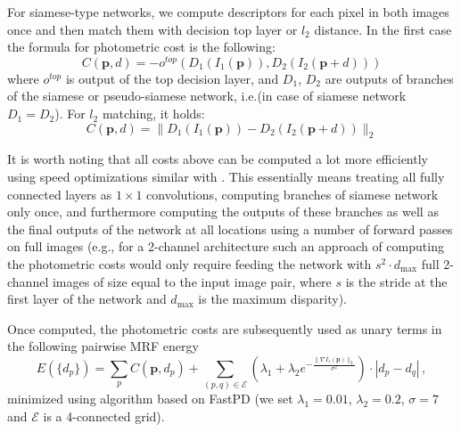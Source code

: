 \documentclass[10pt,twocolumn,letterpaper]{article}
\begin{document}
For siamese-type networks, %
we compute descriptors for each pixel
in both images once and then match them with decision top layer or $l_2$ distance. In the first case
the formula for photometric cost is the following:
\begin{equation}
  C(\mathbf{p},d) = - o^{top}(D_1(I_1(\mathbf{p})), D_2(I_2(\mathbf{p} + d)))
\end{equation}
where $o^{top}$ is output of the top decision layer, and $D_1$, $D_2$ are outputs of branches of the siamese
or pseudo-siamese network, i.e.\descriptors (in case of siamese network $D_1 = D_2$). For $l_2$ matching, it holds:
\begin{equation}
  C(\mathbf{p},d) = \|D_1(I_1(\mathbf{p})) - D_2(I_2(\mathbf{p} + d))\|_2
\end{equation}

It is worth noting that all costs above can be computed a lot more efficiently  using  speed optimizations similar with \cite{Zbontar}. This essentially means treating all fully connected layers as $1\times 1$ convolutions, computing branches of siamese network  only once, and furthermore computing the outputs of these branches as well as the final outputs of the network at all locations using a number of forward passes on full images (e.g.,  for a 2-channel architecture  such an approach of computing the photometric costs  would only require  feeding the network with $s^2\cdot d_{\mathrm{max}}$ full 2-channel images of size equal to the input image pair, where $s$ is the stride at the first layer of the network and $d_{\mathrm{max}}$ is the maximum disparity).

Once computed, the  photometric costs are  subsequently used as unary terms in the following pairwise MRF energy  
\[
E(\{d_p\}) \!=\! \sum_pC(\mathbf{p},d_p) +\!\!\! \sum_{(p,q)\in \mathcal{E}}\!\!\!(\lambda_1 + \lambda_2e^{-\frac{\|{\nabla}I_1(\mathbf{p})\|_2}{\sigma^2}}) \cdot|d_p-d_q|\,,
\]
minimized using algorithm \cite{NIPS2014_IbyL}  based on FastPD \cite{komodakis_cvpr2007} (we set $\lambda_1\!=\!0.01$, $\lambda_2\!=\!0.2$, $\sigma\!=\!7$ and $\mathcal{E}$ is a 4-connected grid).
\end{document}
